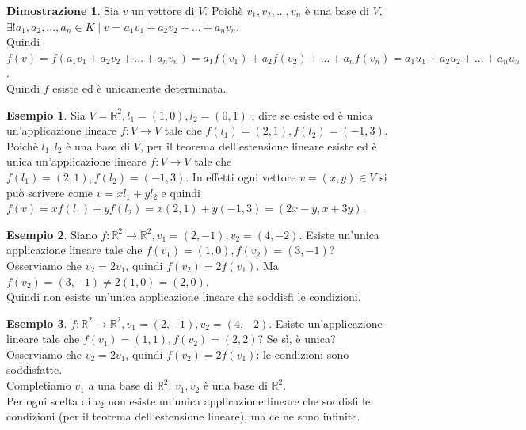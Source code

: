 \documentclass[a4paper]{article}
\theoremstyle{definition}
\newtheorem*{dimm}{Dimostrazione}
\newtheorem*{es}{Esempio}
\begin{document}
\begin{dimm}
	Sia $v$ un vettore di $V$. Poichè $v_1, v_2, ..., v_n$ è una base di $V$, $\exists! a_1, a_2, ..., a_n \in K \mid v = a_1v_1 + a_2v_2 + ... + a_nv_n$. \\
	Quindi $f(v) = f(a_1v_1 + a_2v_2 + ... + a_nv_n) = a_1f(v_1) + a_2f(v_2) + ... + a_nf(v_n) = a_1u_1 + a_2u_2 + ... + a_nu_n$. \\
	Quindi $f$ esiste ed è unicamente determinata.
\end{dimm}
\begin{es}
	Sia $V = \mathbb{R}^2, l_1 = (1, 0), l_2 = (0, 1)$ , dire se esiste ed è unica un'applicazione lineare $f: V \rightarrow V$ tale che $f(l_1) = (2, 1), f(l_2) = (-1, 3)$. \\
	Poichè $l_1, l_2$ è una base di $V$, per il teorema dell'estensione lineare esiste ed è unica un'applicazione lineare $f: V \rightarrow V$ tale che $f(l_1) = (2, 1), f(l_2) = (-1, 3)$.
	In effetti ogni vettore $v = (x, y) \in V$ si può scrivere come $v = xl_1 + yl_2$ e quindi $f(v) = xf(l_1) + yf(l_2) = x(2, 1) + y(-1, 3) = (2x - y, x + 3y)$.
\end{es}
\begin{es}
	Siano $f: \mathbb{R}^2 \rightarrow \mathbb{R}^2, v_1 = (2, -1), v_2 = (4, -2)$.
	Esiste un'unica applicazione lineare tale che $f(v_1) = (1, 0), f(v_2) = (3, -1)$? \\
	Osserviamo che $v_2 = 2v_1$, quindi $f(v_2) = 2f(v_1)$. Ma $f(v_2) = (3, -1) \neq 2(1, 0) = (2, 0)$. \\
	Quindi non esiste un'unica applicazione lineare che soddisfi le condizioni.
\end{es}
\begin{es}
	$f: \mathbb{R}^2 \rightarrow \mathbb{R}^2, v_1 = (2, -1), v_2 = (4, -2)$.
	Esiste un'applicazione lineare tale che $f(v_1) = (1, 1), f(v_2) = (2, 2)$? Se sì, è unica? \\
	Osserviamo che $v_2 = 2v_1$, quindi $f(v_2) = 2f(v_1)$: le condizioni sono soddisfatte. \\
	Completiamo $v_1$ a una base di $\mathbb{R}^2$: $v_1, v_2$ è una base di $\mathbb{R}^2$. \\
	Per ogni scelta di $v_2$ non esiste un'unica applicazione lineare che soddisfi le condizioni (per il teorema dell'estensione lineare), ma ce ne sono infinite.
\end{es}
\end{document}
